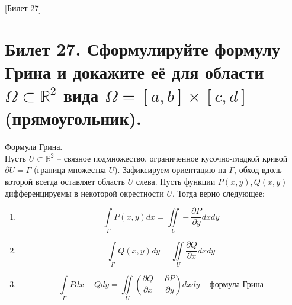 [Билет 27]

\section{Билет 27. Сформулируйте формулу Грина и докажите её для области $\Omega \subset \mathbb{R}^2$ вида $\Omega = [a, b] \times [c, d]$ (прямоугольник).}

\begin{theorem}{Формула Грина.}\\
    Пусть $U \subset \mathbb{R}^2$ -- связное подмножество, ограниченное кусочно-гладкой кривой $\partial U = \Gamma$ (граница множества $U$).
    Зафиксируем ориентацию на $\Gamma$, обход вдоль которой всегда оставляет область $U$ слева. Пусть функции $P(x, y), Q(x, y)$ дифференцируемы
    в некоторой окрестности $U$. Тогда верно следующее:
    \begin{enumerate}
        \item \[ \int\limits_{\Gamma} P(x, y)dx = \iint\limits_{U} -\frac{\partial P}{\partial y}dxdy \]
        \item \[ \int\limits_{\Gamma} Q(x, y)dy = \iint\limits_{U} \frac{\partial Q}{\partial x}dxdy \]
        \item \[ \int\limits_{\Gamma} Pdx + Qdy =
                \iint\limits_{U} \left(\frac{\partial Q}{\partial x} - \frac{\partial P}{\partial y}\right)dxdy \text{ -- формула Грина}\]
    \end{enumerate}
\end{theorem}

